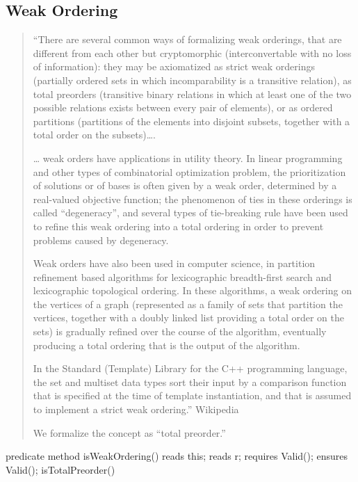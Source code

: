 \documentclass[letterpaper,10pt,english]{sphinxmanual}
\begin{document}
\subsection{Weak Ordering}
\label{\detokenize{08-relations:weak-ordering}}\begin{quote}

“There are several common ways of formalizing weak orderings,
that are different from each other but cryptomorphic
(interconvertable with no loss of information): they may be
axiomatized as strict weak orderings (partially ordered sets
in which incomparability is a transitive relation), as total
preorders (transitive binary relations in which at least one
of the two possible relations exists between every pair of
elements), or as ordered partitions (partitions of the
elements into disjoint subsets, together with a total order
on the subsets)….

… weak orders have applications in utility theory. In
linear programming and other types of combinatorial
optimization problem, the prioritization of solutions or
of bases is often given by a weak order, determined by a
real-valued objective function; the phenomenon of ties
in these orderings is called “degeneracy”, and several
types of tie-breaking rule have been used to refine this
weak ordering into a total ordering in order to prevent
problems caused by degeneracy.

Weak orders have also been used in computer science, in
partition refinement based algorithms for lexicographic
breadth-first search and lexicographic topological ordering.
In these algorithms, a weak ordering on the vertices of
a graph (represented as a family of sets that partition
the vertices, together with a doubly linked list providing
a total order on the sets) is gradually refined over the
course of the algorithm, eventually producing a total
ordering that is the output of the algorithm.

In the Standard (Template) Library for the C++ programming
language, the set and multiset data types sort their input
by a comparison function that is specified at the time of
template instantiation, and that is assumed to implement
a strict weak ordering.” \textendash{}Wikipedia

We formalize the concept as “total preorder.”
\end{quote}

\begin{sphinxVerbatim}[commandchars=\\\{\}]
predicate method isWeakOrdering()
    reads this;
    reads r;
    requires Valid();
    ensures Valid();
\PYGZob{}
    isTotalPreorder()
\PYGZcb{}
\end{sphinxVerbatim}
\end{document}
